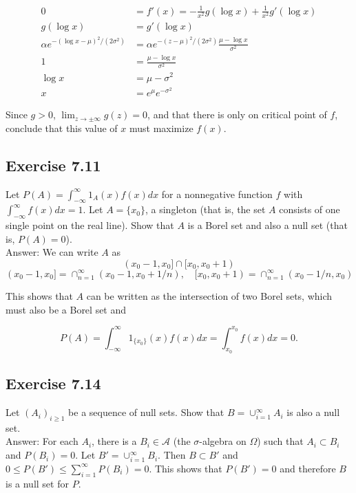 \documentclass{article}
\begin{document}
\begin{align*}
0 &= f'(x) = -\frac{1}{x^2}g(\log x) + \frac{1}{x^2}g'(\log x) \\
g(\log x) &= g'(\log x) \\
\alpha e^{-(\log x -\mu)^2 / (2\sigma^2)} &=
\alpha e^{-(z-\mu)^2 / (2\sigma^2)}\frac{\mu - \log x}{\sigma^2} \\
1 &= \frac{\mu - \log x}{\sigma^2} \\
\log x &= \mu - \sigma^2 \\
x &= e^\mu e^{-\sigma^2}
\end{align*}

Since $g > 0$, $\lim_{z \rightarrow \pm \infty}  g(z) = 0$, and that there is only on critical point of $f$, conclude that this value of $x$ must maximize $f(x)$. 

\subsection*{Exercise 7.11}

Let $P(A) = \int_{-\infty}^\infty 1_{A}(x)f(x)dx$ for a nonnegative function $f$ with $\int_{-\infty}^\infty f(x)dx = 1$. Let $A = \{x_0\}$, a singleton (that is, the set $A$ consists of one single point on the real line). Show that $A$ is a Borel set and also a null set (that is, $P(A) = 0$). \\

Answer: We can write $A$ as 
$$
(x_0 - 1, x_0] \cap [x_0, x_0 + 1)
$$
$$
(x_0 - 1, x_0] = \cap_{n=1}^\infty (x_0 - 1, x_0 + 1/n),\quad [x_0, x_0 + 1) = \cap_{n=1}^\infty (x_0 - 1/n, x_0)$$

This shows that $A$ can be written as the intersection of two Borel sets, which must also be a Borel set and

$$
P(A) = \int_{-\infty}^\infty 1_{\{x_0\}}(x)f(x) dx = \int_{x_0}^{x_0} f(x) dx = 0 .
$$ 

\subsection*{Exercise 7.14}

Let $(A_i)_{i\geq 1}$ be a sequence of null sets. Show that $B = \cup_{i=1}^\infty A_i$ is also a null set.\\

Answer: For each $A_i$, there is a $B_i \in \mathcal{A}$ (the $\sigma$-algebra on $\Omega$) such that $A_i \subset B_i$ and $P(B_i) = 0$. Let $B' = \cup_{i=1}^\infty B_i$. Then $B \subset B'$ and $0 \leq P(B') \leq \sum_{i=1}^\infty P(B_i) = 0$. This shows that $P(B') = 0$ and therefore $B$ is a null set for $P$.  
\end{document}
